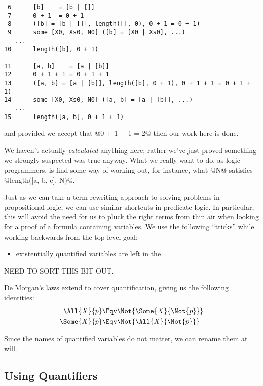 \begin{itemize}
\begin{verbatim}
 6      [b]    = [b | []]
 7      0 + 1  = 0 + 1
 8      ([b] = [b | []], length([], 0), 0 + 1 = 0 + 1)
 9      some [X0, Xs0, N0] ([b] = [X0 | Xs0], ...)
   ...
10      length([b], 0 + 1)

11      [a, b]    = [a | [b]]
12      0 + 1 + 1 = 0 + 1 + 1
13      ([a, b] = [a | [b]], length([b], 0 + 1), 0 + 1 + 1 = 0 + 1 + 1)
14      some [X0, Xs0, N0] ([a, b] = [a | [b]], ...)
   ...
15      length([a, b], 0 + 1 + 1)
\end{verbatim}
and provided we accept that @0 + 1 + 1 = 2@ then our work here is done.

We haven't actually \emph{calculated} anything here; rather we've just
proved something we strongly suspected was true anyway.  What we really
want to do, as logic programmers, is find some way of working out, for
instance, what @N@ satisfies @length([a, b, c], N)@.

Just as we can take a term rewriting approach to solving problems in
propositional logic, we can use similar shortcuts in predicate logic.
In particular, this will avoid the need for us to pluck the right terms
from thin air when looking for a proof of a formula containing variables.
We use the following ``tricks'' while working backwards from the
top-level goal:
\begin{itemize}
\item existentially quantified variables are left in the 
\end{itemize}
\XXX NEED TO SORT THIS BIT OUT.





De Morgan's laws extend to cover quantification, giving us the following
identities:
\begin{align*}
\All{X}{p}
& \Eqv \Not{\Some{X}{\Not{p}}} \\
\Some{X}{p}
& \Eqv \Not{\All{X}{\Not{p}}} \\
\end{align*}

Since the names of quantified variables do not matter, we can rename
them at will.

\subsection{Using Quantifiers}


\end{itemize}
